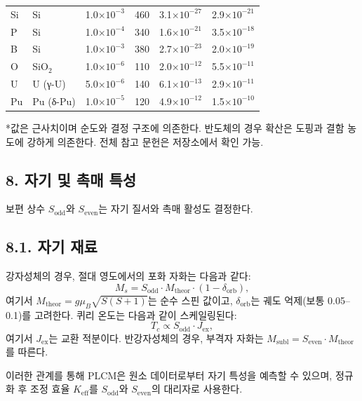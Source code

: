 \documentclass[12pt,a4paper]{article}
\begin{document}
\begin{longtable}{p{1.2cm}p{1.2cm}p{2.0cm}p{2.5cm}p{2.5cm}p{2.5cm}}
		Si & Si & 1.0\(\times10^{-3}\) & 460 & 3.1\(\times10^{-27}\) & 2.9\(\times10^{-21}\) \\
		P & Si & 1.0\(\times10^{-4}\) & 340 & 1.6\(\times10^{-21}\) & 3.5\(\times10^{-18}\) \\
		B & Si & 1.0\(\times10^{-3}\) & 380 & 2.7\(\times10^{-23}\) & 2.0\(\times10^{-19}\) \\
		O & SiO\(_2\) & 1.0\(\times10^{-6}\) & 110 & 2.0\(\times10^{-12}\) & 5.5\(\times10^{-11}\) \\
		U & U (γ-U) & 5.0\(\times10^{-6}\) & 140 & 6.1\(\times10^{-13}\) & 2.9\(\times10^{-11}\) \\
		Pu & Pu (δ-Pu) & 1.0\(\times10^{-5}\) & 120 & 4.9\(\times10^{-12}\) & 1.5\(\times10^{-10}\) \\
		\bottomrule
	\end{longtable}
	*값은 근사치이며 순도와 결정 구조에 의존한다. 반도체의 경우 확산은 도핑과 결함 농도에 강하게 의존한다. 전체 참고 문헌은 저장소에서 확인 가능.
	
	
	\subsection*{8. 자기 및 촉매 특성}
	
	보편 상수 \(S_{\text{odd}}\)와 \(S_{\text{even}}\)는 자기 질서와 촉매 활성도 결정한다.
	
	\subsection*{8.1. 자기 재료}
	강자성체의 경우, 절대 영도에서의 포화 자화는 다음과 같다:
	\[
	M_s = S_{\text{odd}} \cdot M_{\text{theor}} \cdot (1 - \delta_{\text{orb}}),
	\]
	여기서 \(M_{\text{theor}} = g \mu_B \sqrt{S(S+1)}\)는 순수 스핀 값이고, \(\delta_{\text{orb}}\)는 궤도 억제(보통 0.05–0.1)를 고려한다. 퀴리 온도는 다음과 같이 스케일링된다:
	\[
	T_c \propto S_{\text{odd}} \cdot J_{\text{ex}},
	\]
	여기서 \(J_{\text{ex}}\)는 교환 적분이다. 반강자성체의 경우, 부격자 자화는 \(M_{\text{subl}} = S_{\text{even}} \cdot M_{\text{theor}}\)를 따른다.
	
	이러한 관계를 통해 PLCM은 원소 데이터로부터 자기 특성을 예측할 수 있으며, 정규화 후 조정 효율 \(K_{\text{eff}}\)를 \(S_{\text{odd}}\)와 \(S_{\text{even}}\)의 대리자로 사용한다.
	
\end{document}
